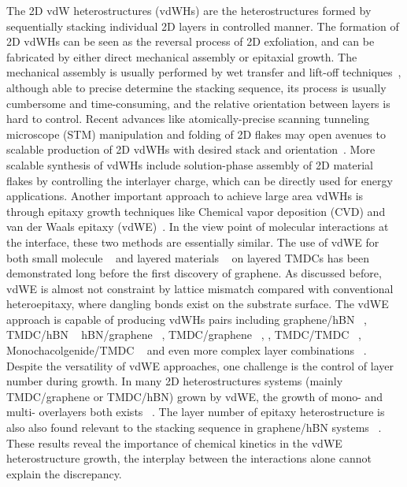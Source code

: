 The 2D vdW heterostructures (vdWHs) are the heterostructures formed by
sequentially stacking individual 2D layers in controlled manner. The
formation of 2D vdWHs can be seen as the reversal process of 2D
exfoliation, and can be fabricated by either direct mechanical
assembly or epitaxial growth.
%
The mechanical assembly is usually performed by wet transfer and
lift-off techniques~\cite{Novoselov_2016_vdW},
although able to precise determine the stacking
sequence, its process is usually cumbersome and time-consuming, and
the relative orientation between layers is hard to
control.
Recent advances like atomically-precise scanning tunneling microscope
(STM) manipulation and folding of 2D flakes may open avenues to
scalable production of 2D vdWHs with desired stack and
orientation~\cite{Chen_2019_STM_graphene}.
%
More scalable synthesis of vdWHs include solution-phase assembly of 2D
material flakes by controlling the interlayer charge, which can be
directly used for energy applications.
%
Another important approach to achieve large area vdWHs is through
epitaxy growth techniques like Chemical vapor deposition (CVD) and
van der Waals epitaxy (vdWE)~\cite{Novoselov_2016_vdW}. In the view point of
molecular interactions at the interface, these two methods are
essentially similar. The use of vdWE for both
small molecule ~\cite{Hara_1989_ME,Sakurai_1991_c60_mos2} and
layered materials
~\cite{Koma_1985_vdWE,Ueno_1990_vdWE,Ohuchi_1990_MoSe2_SnS2,Parkinson_1991_vdWE}
on layered TMDCs has been demonstrated long before the first discovery
of graphene. As discussed before, vdWE is almost not constraint by lattice mismatch compared with conventional heteroepitaxy,
where dangling bonds exist on the substrate surface.
%
The vdWE approach is capable of producing vdWHs pairs including
graphene/hBN ~\cite{Yang_2013_gr_hBN}, TMDC/hBN
~\cite{Yan_2015_MoS2_on_hBN,Wang_2015_cvd_MoS2_BN,
  Cattelan_2015_Ws2_hBN} hBN/graphene ~\cite{Lin_2014_vdW_solid},
TMDC/graphene
~\cite{Shi_2012_vdw_epi_MoS2_gr,McCreary_2014_MoS2_gr,Azizi_2015_Freevdw_Gr_TMDCs,Miwa_2015_MoS2_gr,Ago_2015_MoS2_Gr,Lin_2014_WS2_Gr,Lin_2015_Wse2_MoS2_gr},
, TMDC/TMDC ~\cite{Diaz_2015_MoTe2_MoSe2,Gong_2014_WS2_MoS2},
Monochacolgenide/TMDC
~\cite{Li_2016_GaSe_MoSe2_vdW,Zhang_2014_vdw_epi_SnS2_MoS2} and even
more complex layer combinations
~\cite{Lin_2015_Wse2_MoS2_gr,Alemayehu_2015_TMDC_vdw}.
% 
Despite the versatility of vdWE approaches, one challenge is the
control of layer number  during growth.
%
In many 2D heterostructures systems (mainly TMDC/graphene or TMDC/hBN)
grown by vdWE, the growth of mono- and multi- overlayers both exists
~\cite{Shi_2012_vdw_epi_MoS2_gr,Azizi_2015_Freevdw_Gr_TMDCs,Miwa_2015_MoS2_gr,Yan_2015_MoS2_on_hBN}.
%
The layer number of epitaxy heterostructure is also
also found relevant to the stacking sequence in graphene/hBN systems ~\cite{Wu_2015_Gr_hBN,Yang_2013_gr_hBN,Wu_2015_Gr_hBN}.
%
These results reveal the
importance of chemical kinetics in the vdWE heterostructure growth,
the interplay between the interactions alone cannot explain the
discrepancy.

